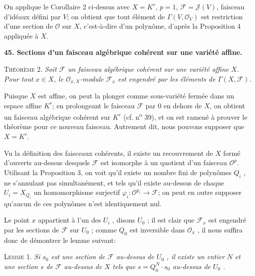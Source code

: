 On applique le Corollaire 2 ci-dessus avec $X = K^r$, $p = 1$, $\mathcal{F} = \mathcal{J}(V)$, faisceau d'idéaux défini par $V$; on obtient que tout élément de $\Gamma(V, \mathcal{O}_V)$ est restriction d'une section de $\mathcal{O}$ sur $X$, c'est-à-dire d'un polynôme, d'après la Proposition 4 appliquée à $X$.


\textbf{45. Sections d'un faisceau algébrique cohérent sur une variété affine.}

\textsc{Théorème} 2. \textit{Soit $\mathcal{F}$ un faisceau algébrique cohérent sur une variété affine $X$. Pour tout $x \in X$, le $\mathcal{O}_{x,X}$-module $\mathcal{F}_x$ est engendré par les éléments de $\Gamma(X, \mathcal{F})$.}

Puisque $X$ est affine, on peut la plonger comme sous-variété fermée dans un espace affine $K^r$; en prolongeant le faisceau $\mathcal{F}$ par 0 en dehors de $X$, on obtient un faisceau algébrique cohérent sur $K^r$ (cf. n\textsuperscript{o} 39), et on est ramené à prouver le théorème pour ce nouveau faisceau. Autrement dit, nous pouvons supposer que $X = K^r$.

Vu la définition des faisceaux cohérents, il existe un recouvrement de $X$ formé d'ouverts au-dessus desquels $\mathcal{F}$ est isomorphe à un quotient d'un faisceau $\mathcal{O}^p$. Utilisant la Proposition 3, on voit qu'il existe un nombre fini de polynômes $Q_i$ , ne s'annulant pas simultanément, et tels qu'il existe au-dessus de chaque $U_i = X_{Q_i}$ un homomorphisme surjectif $\varphi_i : \mathcal{O}^{p_i} \to \mathcal{F}$; on peut en outre supposer qu'aucun de ces polynômes n'est identiquement nul.

Le point $x$ appartient à l'un des $U_i$ , disons $U_0$ ; il est clair que $\mathcal{F}_x$ est engendré par les sections de $\mathcal{F}$ sur $U_0$ ; comme $Q_0$ est inversible dans $\mathcal{O}_x$ , il nous suffira donc de démontrer le lemme suivant:

\textsc{Lemme} 1. \textit{Si $s_0$ est une section de $\mathcal{F}$ au-dessus de $U_0$ , il existe un entier $N$ et une section $s$ de $\mathcal{F}$ au-dessus de $X$ tels que $s = Q_0^N \cdot s_0$ au-dessus de $U_0$ .}

